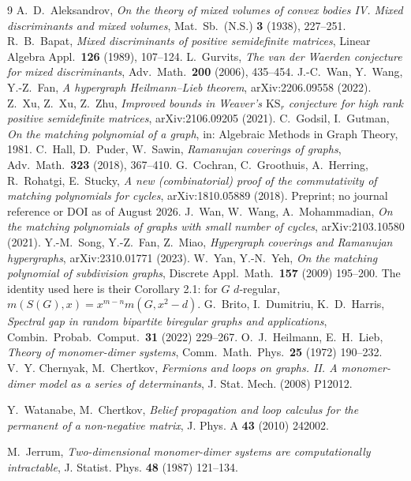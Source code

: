 \documentclass[11pt]{article}
\theoremstyle{remark}
\begin{document}
\begin{thebibliography}{9}
 A.~D.~Aleksandrov, \emph{On the theory of mixed volumes of convex bodies IV.
Mixed discriminants and mixed volumes}, Mat.\ Sb.\ (N.S.) \textbf{3} (1938), 227--251.
 R.~B.~Bapat, \emph{Mixed discriminants of positive semidefinite matrices},
Linear Algebra Appl.\ \textbf{126} (1989), 107--124.
 L.~Gurvits, \emph{The van der Waerden conjecture for mixed discriminants},
Adv.\ Math.\ \textbf{200} (2006), 435--454.
 J.-C.~Wan, Y.~Wang, Y.-Z.~Fan, \emph{A hypergraph Heilmann--Lieb
theorem}, arXiv:2206.09558 (2022).
 Z.~Xu, Z.~Xu, Z.~Zhu, \emph{Improved bounds in Weaver's
$\mathrm{KS}_r$ conjecture for high rank positive semidefinite matrices},
arXiv:2106.09205 (2021).
 C.~Godsil, I.~Gutman, \emph{On the matching polynomial of a
graph}, in: Algebraic Methods in Graph Theory, 1981.
 C.~Hall, D.~Puder, W.~Sawin, \emph{Ramanujan coverings of
graphs}, Adv.\ Math.\ \textbf{323} (2018), 367--410.
 G.~Cochran, C.~Groothuis, A.~Herring, R.~Rohatgi,
E.~Stucky, \emph{A new (combinatorial) proof of the commutativity of
matching polynomials for cycles}, arXiv:1810.05889 (2018). Preprint; no journal
reference or DOI as of August 2026.
 J.~Wan, W.~Wang, A.~Mohammadian, \emph{On the matching
polynomials of graphs with small number of cycles}, arXiv:2103.10580 (2021).
 Y.-M.~Song, Y.-Z.~Fan, Z.~Miao, \emph{Hypergraph coverings and
Ramanujan hypergraphs}, arXiv:2310.01771 (2023).
 W.~Yan, Y.-N.~Yeh, \emph{On the matching polynomial of subdivision
graphs}, Discrete Appl.\ Math.\ \textbf{157} (2009) 195--200. The identity used
here is their Corollary 2.1: for $G$ $d$-regular, $m(S(G),x)=x^{m-n}m(G,x^2-d)$.
 G.~Brito, I.~Dumitriu, K.~D.~Harris, \emph{Spectral gap in random
bipartite biregular graphs and applications}, Combin.\ Probab.\ Comput.\
\textbf{31} (2022) 229--267.
 O.~J.~Heilmann, E.~H.~Lieb, \emph{Theory of monomer-dimer
systems}, Comm.\ Math.\ Phys.\ \textbf{25} (1972) 190--232.
 V.~Y. Chernyak, M.~Chertkov, \emph{Fermions and loops on graphs.
II. A monomer-dimer model as a series of determinants}, J. Stat. Mech. (2008)
P12012.

 Y.~Watanabe, M.~Chertkov, \emph{Belief propagation and loop calculus
for the permanent of a non-negative matrix}, J. Phys. A \textbf{43} (2010)
242002.

 M.~Jerrum, \emph{Two-dimensional monomer-dimer systems are
computationally intractable}, J. Statist. Phys. \textbf{48} (1987) 121--134.


\end{thebibliography}
\end{document}

